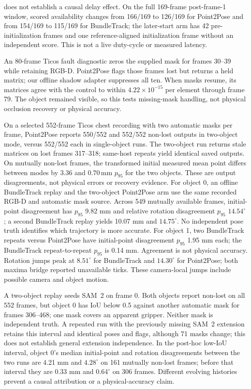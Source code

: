\documentclass[10pt,journal]{IEEEtran}
\begin{document}
does not establish a causal delay effect. On the full 169-frame post-frame-1 window, scored availability changes from 166/169 to 126/169 for Point2Pose and from 154/169 to 115/169 for BundleTrack; the later-start arm has 42 pre-initialization frames and one reference-aligned initialization frame without an independent score. This is not a live duty-cycle or measured latency.

An 80-frame Ticos fault diagnostic zeros the supplied mask for frames 30--39 while retaining RGB-D. Point2Pose flags those frames lost but returns a held matrix; our offline shadow adapter suppresses all ten. When masks resume, its matrices agree with the control to within $4.22\times10^{-15}$ per element through frame 79. The object remained visible, so this tests missing-mask handling, not physical occlusion recovery or physical accuracy.

On a selected 552-frame Ticos chest recording with two automatic masks per frame, Point2Pose reports 550/552 and 552/552 non-lost outputs in two-object mode, versus 552/552 each in single-object runs. The two-object run returns stale matrices on lost frames 317--318; same-host repeats yield identical saved outputs. On mutually non-lost frames, the transformed initial measured mean point differs between modes by $3.36$ and $0.70\,\mathrm{mm}$ $p_{95}$ for the two objects. These are output disagreements, not physical errors or recovery evidence. For object 0, an offline BundleTrack replay and the two-object Point2Pose arm use the same recorded RGB-D and automatic mask source. Across 549 mutually available frames, initial-point disagreement has $p_{95}$ 9.82 mm and relative rotation disagreement $p_{95}$ $14.54^\circ$; a second BundleTrack replay yields 10.07 mm and $14.75^\circ$. No independent pose truth identifies which trajectory is more accurate. For object 1, two BundleTrack repeats versus Point2Pose have initial-point disagreement $p_{95}$ 1.95 mm each; the BundleTrack repeat-to-repeat $p_{95}$ is 0.14 mm. Agreement is not physical accuracy. Rotation jumps peak at $8.51^\circ$ for BundleTrack and $14.30^\circ$ for Point2Pose; both maxima bridge reported unavailable ticks. These camera-local jumps include possible camera and object motion.

A two-object replay seeds SAM~2 on frame 0. Both objects report non-lost on all 552 frames, but object 0 has IoU below 0.5 against another automatic mask for frames 306--468; one mask covers an apparent gripper. Neither mask is independent truth. A repeated run with the previously missing SAM~2 extension retains this interval and identical poses and flags, although 71 masks change; this does not establish general extension independence. In the post-hoc low-IoU interval, object 0's median initial-point and rotation disagreements between the two runs are 4.21 mm and $4.28^\circ$ on 161 mutually non-lost frames; before that interval they are 0.33 mm and $0.64^\circ$ on 306 frames. Different evolving histories prevent a causal attribution or a physical-accuracy claim.
\end{document}
